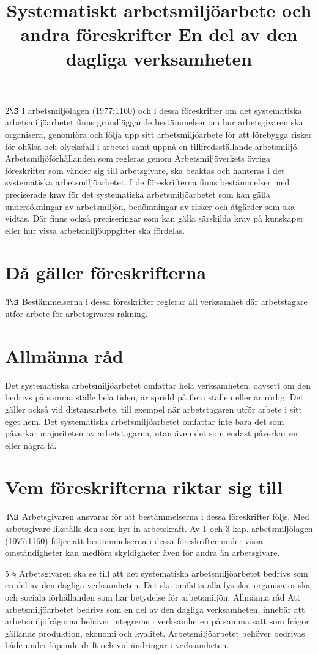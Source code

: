 \title{
Systematiskt arbetsmiljöarbete och andra föreskrifter
}
\(2 \S\) I arbetsmiljölagen (1977:1160) och i dessa föreskrifter om det systematiska arbetsmiljöarbetet finns grundläggande bestämmelser om hur arbetsgivaren ska organisera, genomföra och följa upp sitt arbetsmiljöarbete för att förebygga risker för ohälsa och olycksfall i arbetet samt uppnå en tillfredsställande arbetsmiljö.
Arbetsmiljöförhållanden som regleras genom Arbetsmiljöverkets övriga föreskrifter som vänder sig till arbetsgivare, ska beaktas och hanteras i det systematiska arbetsmiljöarbetet. I de föreskrifterna finns bestämmelser med preciserade krav för det systematiska arbetsmiljöarbetet som kan gälla undersökningar av arbetsmiljön, bedömningar av risker och åtgärder som ska vidtas. Där finns också preciseringar som kan gälla särskilda krav på kunskaper eller hur vissa arbetsmiljöuppgifter ska fördelas.
\section*{Då gäller föreskrifterna}
\(3 \S\) Bestämmelserna i dessa föreskrifter reglerar all verksamhet där arbetstagare utför arbete för arbetsgivares räkning.
\section*{Allmänna råd}
Det systematiska arbetsmiljöarbetet omfattar hela verksamheten, oavsett om den bedrivs på samma ställe hela tiden, är spridd på flera ställen eller är rörlig. Det gäller också vid distansarbete, till exempel när arbetstagaren utför arbete i sitt eget hem. Det systematiska arbetsmiljöarbetet omfattar inte bara det som påverkar majoriteten av arbetstagarna, utan även det som endast påverkar en eller några få.
\section*{Vem föreskrifterna riktar sig till}
\(4 \S\) Arbetsgivaren ansvarar för att bestämmelserna i dessa föreskrifter följs. Med arbetsgivare likställs den som hyr in arbetskraft.
Av 1 och 3 kap. arbetsmiljölagen (1977:1160) följer att bestämmelserna i dessa föreskrifter under vissa omständigheter kan medföra skyldigheter även för andra än arbetsgivare.

\title{
En del av den dagliga verksamheten
}
5 § Arbetsgivaren ska se till att det systematiska arbetsmiljöarbetet bedrivs som en del av den dagliga verksamheten. Det ska omfatta alla fysiska, organisatoriska och sociala förhållanden som har betydelse för arbetsmiljön.
Allmänna råd
Att arbetsmiljöarbetet bedrivs som en del av den dagliga verksamheten, innebär att arbetsmiljöfrågorna behöver integreras i verksamheten på samma sätt som frågor gällande produktion, ekonomi och kvalitet.
Arbetsmiljöarbetet behöver bedrivas både under löpande drift och vid ändringar i verksamheten.
